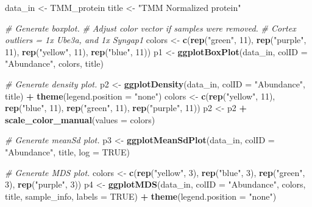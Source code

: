 \documentclass[]{article}
\newenvironment{Shaded}{\begin{snugshade}}{\end{snugshade}}
\newcommand{\KeywordTok}[1]{\textcolor[rgb]{0.13,0.29,0.53}{\textbf{#1}}}
\newcommand{\DataTypeTok}[1]{\textcolor[rgb]{0.13,0.29,0.53}{#1}}
\newcommand{\DecValTok}[1]{\textcolor[rgb]{0.00,0.00,0.81}{#1}}
\newcommand{\StringTok}[1]{\textcolor[rgb]{0.31,0.60,0.02}{#1}}
\newcommand{\CommentTok}[1]{\textcolor[rgb]{0.56,0.35,0.01}{\textit{#1}}}
\newcommand{\OtherTok}[1]{\textcolor[rgb]{0.56,0.35,0.01}{#1}}
\newcommand{\OperatorTok}[1]{\textcolor[rgb]{0.81,0.36,0.00}{\textbf{#1}}}
\newcommand{\NormalTok}[1]{#1}
\begin{document}
\begin{Shaded}
\begin{Highlighting}[]
\NormalTok{data_in <-}\StringTok{ }\NormalTok{TMM_protein}
\NormalTok{title <-}\StringTok{ "TMM Normalized protein"}

\CommentTok{# Generate boxplot.}
\CommentTok{# Adjust color vector if samples were removed.}
\CommentTok{# Cortex outliers = 1x Ube3a, and 1x Syngap1}
\NormalTok{colors <-}\StringTok{ }\KeywordTok{c}\NormalTok{(}\KeywordTok{rep}\NormalTok{(}\StringTok{"green"}\NormalTok{, }\DecValTok{11}\NormalTok{), }\KeywordTok{rep}\NormalTok{(}\StringTok{"purple"}\NormalTok{, }\DecValTok{11}\NormalTok{), }\KeywordTok{rep}\NormalTok{(}\StringTok{"yellow"}\NormalTok{, }\DecValTok{11}\NormalTok{), }\KeywordTok{rep}\NormalTok{(}\StringTok{"blue"}\NormalTok{, }\DecValTok{11}\NormalTok{))}
\NormalTok{p1 <-}\StringTok{ }\KeywordTok{ggplotBoxPlot}\NormalTok{(data_in, }\DataTypeTok{colID =} \StringTok{"Abundance"}\NormalTok{, colors, title)}

\CommentTok{# Generate density plot.}
\NormalTok{p2 <-}\StringTok{ }\KeywordTok{ggplotDensity}\NormalTok{(data_in, }\DataTypeTok{colID =} \StringTok{"Abundance"}\NormalTok{, title) }\OperatorTok{+}\StringTok{ }\KeywordTok{theme}\NormalTok{(}\DataTypeTok{legend.position =} \StringTok{"none"}\NormalTok{)}
\NormalTok{colors <-}\StringTok{ }\KeywordTok{c}\NormalTok{(}\KeywordTok{rep}\NormalTok{(}\StringTok{"yellow"}\NormalTok{, }\DecValTok{11}\NormalTok{), }\KeywordTok{rep}\NormalTok{(}\StringTok{"blue"}\NormalTok{, }\DecValTok{11}\NormalTok{), }\KeywordTok{rep}\NormalTok{(}\StringTok{"green"}\NormalTok{, }\DecValTok{11}\NormalTok{), }\KeywordTok{rep}\NormalTok{(}\StringTok{"purple"}\NormalTok{, }\DecValTok{11}\NormalTok{))}
\NormalTok{p2 <-}\StringTok{ }\NormalTok{p2 }\OperatorTok{+}\StringTok{ }\KeywordTok{scale_color_manual}\NormalTok{(}\DataTypeTok{values =}\NormalTok{ colors)}

\CommentTok{# Generate meanSd plot.}
\NormalTok{p3 <-}\StringTok{ }\KeywordTok{ggplotMeanSdPlot}\NormalTok{(data_in, }\DataTypeTok{colID =} \StringTok{"Abundance"}\NormalTok{, title, }\DataTypeTok{log =} \OtherTok{TRUE}\NormalTok{)}

\CommentTok{# Generate MDS plot.}
\NormalTok{colors <-}\StringTok{ }\KeywordTok{c}\NormalTok{(}\KeywordTok{rep}\NormalTok{(}\StringTok{"yellow"}\NormalTok{, }\DecValTok{3}\NormalTok{), }\KeywordTok{rep}\NormalTok{(}\StringTok{"blue"}\NormalTok{, }\DecValTok{3}\NormalTok{), }\KeywordTok{rep}\NormalTok{(}\StringTok{"green"}\NormalTok{, }\DecValTok{3}\NormalTok{), }\KeywordTok{rep}\NormalTok{(}\StringTok{"purple"}\NormalTok{, }\DecValTok{3}\NormalTok{))}
\NormalTok{p4 <-}\StringTok{ }\KeywordTok{ggplotMDS}\NormalTok{(data_in, }\DataTypeTok{colID =} \StringTok{"Abundance"}\NormalTok{, colors, title, sample_info, }\DataTypeTok{labels =} \OtherTok{TRUE}\NormalTok{) }\OperatorTok{+}
\StringTok{  }\KeywordTok{theme}\NormalTok{(}\DataTypeTok{legend.position =} \StringTok{"none"}\NormalTok{)}


\end{Highlighting}
\end{Shaded}
\end{document}
